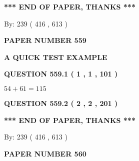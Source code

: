 \documentclass[12pt]{article}
\begin{document}
   
   
\vspace{1.0in} 
{\textbf{\large{ *** END OF PAPER, THANKS *** }}} 
   
   
\hspace{1.0in} By: 
 239 ( 416 ,  613 )
   
   
   
   
\newpage 
\setcounter{page}{ 
   559001 } 
   
   
   
   
 {\textbf{ \Large{ PAPER NUMBER  559  }}}
   
   
\vspace{0.2in}
   
   
   
   
   
   
 \vspace{0.2in}
{\LARGE {\textbf{ A QUICK TEST EXAMPLE}}}
   
   
  
\vspace{0.2in}
  
{\textbf{\Large{QUESTION
559.1 
 ( 1 , 1 , 101 )
}}}
  
  
 
 

$ %
54 +  %
61=   %
115$
 
 
  
\vspace{0.2in}
  
{\textbf{\Large{QUESTION
559.2 
 ( 2 , 2 , 201 )
}}}
  
  
   
   
 \vspace{0.2in}
 
   
   
   
   
\vspace{1.0in} 
{\textbf{\large{ *** END OF PAPER, THANKS *** }}} 
   
   
\hspace{1.0in} By: 
 239 ( 416 ,  613 )
   
   
   
   
\newpage 
\setcounter{page}{ 
   560001 } 
   
   
   
   
 {\textbf{ \Large{ PAPER NUMBER  560  }}}
   
   
\vspace{0.2in}
   
\end{document}
